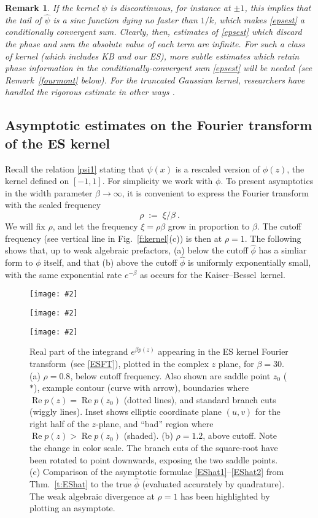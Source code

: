 \documentclass[10pt]{article}
\newcommand{\be}{\begin{equation}}
\newcommand{\ee}{\end{equation}}
\newcommand{\bfi}{\begin{figure}}
\newcommand{\efi}{\end{figure}}
\newcommand{\ca}[2]{\caption{#1 \label{#2}}}
\newcommand{\bmp}[1]{\begin{minipage}{#1}}
\newcommand{\emp}{\end{minipage}}
\newcommand{\pig}[2]{\bmp{#1}\texttt{[image: \#2]}\emp}
\newcommand{\eps}{\varepsilon}
\DeclareMathOperator{\re}{Re}
\newtheorem{rmk}[thm]{Remark}
\newcommand{\freq}{\beta}          %
\newcommand{\KB}{Kaiser--Bessel}
\newcommand{\FT}{Fourier transform}
\begin{document}
\begin{rmk}
  If the kernel $\psi$ is discontinuous, for instance at $\pm1$,
  this implies that the tail of $\hat\psi$
  is a sinc function dying no faster than $1/k$, which makes \eqref{epsest}
  a conditionally convergent sum.
  Clearly, then, estimates of \eqref{epsest}
  which discard the phase and sum the absolute value of each term
  are infinite.
For such a class of kernel (which includes KB and our ES),
more subtle estimates which retain phase information in the
conditionally-convergent sum \eqref{epsest} will be needed
(see Remark~\ref{fourmont} below).
For the truncated Gaussian kernel, researchers have handled
the rigorous estimate in other ways \cite{nufft,elbel,nfftchap}.
\end{rmk}


\subsection{Asymptotic estimates on the Fourier transform of the ES kernel}
\label{s:asymp}

Recall the relation \eqref{psi1} stating that $\psi(x)$ is a rescaled
version of $\phi(z)$, the kernel defined on $[-1,1]$.
For simplicity we work with $\phi$.
To present asymptotics in the width parameter $\freq\to\infty$,
it is convenient to express the Fourier transform with the scaled frequency
\be
\rho \;:=\; \xi/\freq ~.
\label{rho}
\ee
We will fix $\rho$, and let the frequency $\xi=\rho\freq$ grow in proportion
to $\freq$. The cutoff frequency (see vertical line
in Fig.~\ref{f:kernel}(c)) is then at $\rho=1$.
The following shows that, up to weak algebraic prefactors,
(a) below the cutoff $\hat\phi$ has a simliar form to $\phi$ itself,
and that (b) above the cutoff $\hat\phi$ is uniformly exponentially small,
with the same exponential rate $e^{-\freq}$ as occurs for the \KB\ kernel.

\bfi[t] %
\pig{2.2in}{saddlea_lab}
\pig{2.2in}{saddleb_lab}
\pig{2.2in}{saddleft}
\ca{
  Real part of the integrand $e^{\freq p(z)}$
  appearing in the ES kernel \FT\
  (see \eqref{ESFT}),
  plotted in the complex $z$ plane, for $\freq=30$.
  (a) $\rho=0.8$, below cutoff frequency.
  Also shown are saddle point $z_0$ ($\ast$), example contour (curve with arrow),
  boundaries where $\re p(z) = \re p(z_0)$ (dotted lines),
  and standard branch cuts (wiggly lines).
  Inset shows elliptic coordinate plane $(u,v)$ for the right half of the
  $z$-plane, and ``bad'' region where $\re p(z) > \re p(z_0)$ (shaded).
  (b) $\rho =1.2$, above cutoff.
  Note the change in color scale. The branch cuts of the square-root have
  been rotated to point downwards, exposing the two saddle points.
  (c) Comparison of the asymptotic formulae \eqref{EShat1}--\eqref{EShat2}
  from Thm.~\ref{t:EShat}
  to the true $\hat\phi$ (evaluated accurately by quadrature).
  The weak algebraic divergence at $\rho=1$ has been highlighted by plotting
  an %
  asymptote.
}{f:saddle}
\efi
\end{document}
